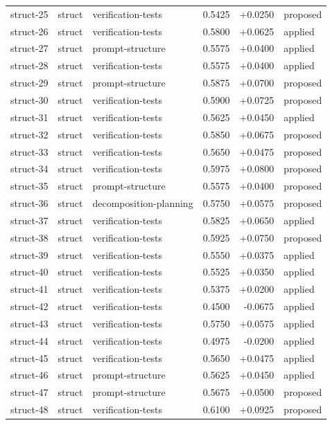 \begin{center}
\begin{longtable}{llp{5.2cm}rrl}
struct-25 & struct & verification-tests & 0.5425 & +0.0250 & proposed \\
struct-26 & struct & verification-tests & 0.5800 & +0.0625 & applied \\
struct-27 & struct & prompt-structure & 0.5575 & +0.0400 & applied \\
struct-28 & struct & verification-tests & 0.5575 & +0.0400 & applied \\
struct-29 & struct & prompt-structure & 0.5875 & +0.0700 & proposed \\
struct-30 & struct & verification-tests & 0.5900 & +0.0725 & proposed \\
struct-31 & struct & verification-tests & 0.5625 & +0.0450 & applied \\
struct-32 & struct & verification-tests & 0.5850 & +0.0675 & proposed \\
struct-33 & struct & verification-tests & 0.5650 & +0.0475 & proposed \\
struct-34 & struct & verification-tests & 0.5975 & +0.0800 & proposed \\
struct-35 & struct & prompt-structure & 0.5575 & +0.0400 & proposed \\
struct-36 & struct & decomposition-planning & 0.5750 & +0.0575 & proposed \\
struct-37 & struct & verification-tests & 0.5825 & +0.0650 & applied \\
struct-38 & struct & verification-tests & 0.5925 & +0.0750 & proposed \\
struct-39 & struct & verification-tests & 0.5550 & +0.0375 & applied \\
struct-40 & struct & verification-tests & 0.5525 & +0.0350 & applied \\
struct-41 & struct & verification-tests & 0.5375 & +0.0200 & applied \\
struct-42 & struct & verification-tests & 0.4500 & -0.0675 & applied \\
struct-43 & struct & verification-tests & 0.5750 & +0.0575 & applied \\
struct-44 & struct & verification-tests & 0.4975 & -0.0200 & applied \\
struct-45 & struct & verification-tests & 0.5650 & +0.0475 & applied \\
struct-46 & struct & prompt-structure & 0.5625 & +0.0450 & applied \\
struct-47 & struct & prompt-structure & 0.5675 & +0.0500 & proposed \\
struct-48 & struct & verification-tests & 0.6100 & +0.0925 & proposed \\

\end{longtable}
\end{center}
